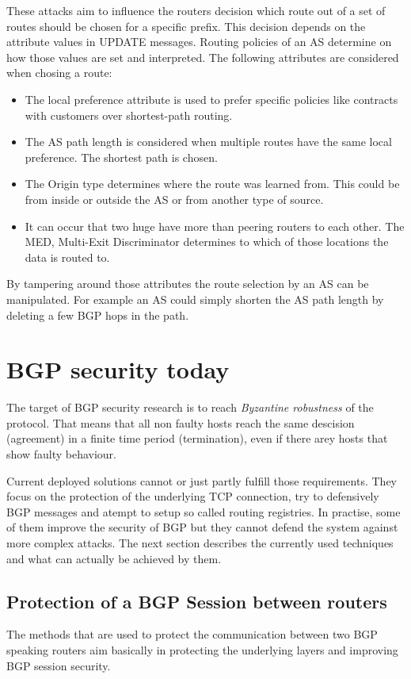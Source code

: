 \documentclass[12pt,a4paper]{IEEEtran}
\begin{document}
		These attacks aim to influence the routers decision which route out of a set of routes should be chosen for a specific prefix. This decision depends on the attribute values in UPDATE messages. Routing policies of an AS determine on how those values are set and interpreted. The following attributes are considered when chosing a route:
		\begin{itemize}
			\item The local preference attribute is used to prefer specific policies like contracts with customers over shortest-path routing.
			\item The AS path length is considered when multiple routes have the same local preference. The shortest path is chosen.
			\item The Origin type determines where the route was learned from. This could be from inside or outside the AS or from another type of source.
			\item It can occur that two huge have more than peering routers to each other. The MED, Multi-Exit Discriminator determines to which of those locations the data is routed to. 
		\end{itemize}
		By tampering around those attributes the route selection by an AS can be manipulated. 
		For example an AS could simply shorten the AS path length by deleting a few BGP hops in the path.

       \section{BGP security today}
		The target of BGP security research is to reach \emph{Byzantine robustness} of the protocol. That means that all non faulty hosts reach the same descision (agreement) in a finite time period (termination), even if there arey hosts that show faulty behaviour. %
		
		Current deployed solutions cannot or just partly fulfill those requirements. They focus on the protection of the underlying TCP connection, try to defensively BGP messages and atempt to setup so called routing registries. In practise, some of them improve the security of BGP but they cannot defend the system against more complex attacks. The next section describes the currently used techniques and what can actually be achieved by them. 



	\subsection{Protection of a BGP Session between routers}
		The methods that are used to protect the communication between two BGP speaking routers aim basically in protecting the underlying layers and improving BGP session security.
\end{document}
